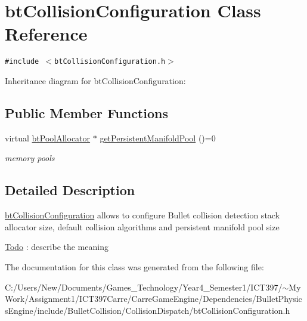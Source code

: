 \hypertarget{classbt_collision_configuration}{
\section{btCollisionConfiguration Class Reference}
\label{classbt_collision_configuration}
}
{\tt \#include $<$btCollisionConfiguration.h$>$}

Inheritance diagram for btCollisionConfiguration:\subsection*{Public Member Functions}
\begin{CompactItemize}
\item 
\hypertarget{classbt_collision_configuration_0885a7c5ff597994cade5b1a495edfa2}{
virtual \hyperlink{classbt_pool_allocator}{btPoolAllocator} $\ast$ \hyperlink{classbt_collision_configuration_0885a7c5ff597994cade5b1a495edfa2}{getPersistentManifoldPool} ()=0}
\label{classbt_collision_configuration_0885a7c5ff597994cade5b1a495edfa2}

\begin{CompactList}\small\item\em memory pools \item\end{CompactList}\end{CompactItemize}


\subsection{Detailed Description}
\hyperlink{classbt_collision_configuration}{btCollisionConfiguration} allows to configure Bullet collision detection stack allocator size, default collision algorithms and persistent manifold pool size \begin{Desc}
\item[\hyperlink{todo__todo000010}{Todo}]: describe the meaning \end{Desc}


The documentation for this class was generated from the following file:\begin{CompactItemize}
\item 
C:/Users/New/Documents/Games\_\-Technology/Year4\_\-Semester1/ICT397/$\sim$My Work/Assignment1/ICT397Carre/CarreGameEngine/Dependencies/BulletPhysicsEngine/include/BulletCollision/CollisionDispatch/btCollisionConfiguration.h\end{CompactItemize}
